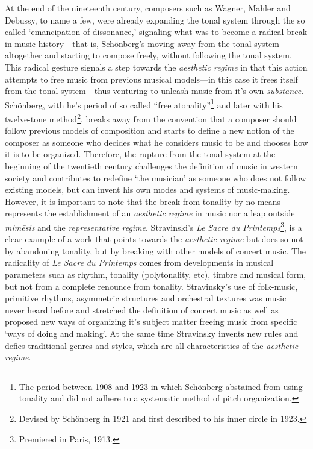 At the end of the nineteenth century, composers such as Wagner, Mahler and Debussy, to name a few, were already expanding the tonal system through the so called `emancipation of dissonance,' signaling what was to become a radical break in music history---that is, Sch\"{o}nberg's moving away from the tonal system altogether and starting to compose freely, without following the tonal system. This radical gesture signals a step towards the \emph{aesthetic regime} in that this action attempts to free music from previous musical models---in this case it frees itself from the tonal system---thus venturing to unleash music from it's own \emph{substance}. Sch\"{o}nberg, with he's period of so called ``free atonality''\footnote{The period between 1908 and 1923 in which Sch\"{o}nberg abstained from using tonality and did not adhere to a systematic method of pitch organization.} and later with his twelve-tone method\footnote{Devised by Sch\"{o}nberg in 1921 and first described to his inner circle in 1923.}, breaks away from the convention that a composer should follow previous models of composition and starts to define a new notion of the composer as someone who decides what he considers music to be and chooses how it is to be organized. Therefore, the rupture from the tonal system at the beginning of the twentieth century challenges the definition of music in western society and contributes to redefine `the musician' as someone who does not follow existing models, but can invent his own modes and systems of music-making. However, it is important to note that the break from tonality by no means represents the establishment of an \emph{aesthetic regime} in music nor a leap outside \emph{mim\={e}sis} and the \emph{representative regime}.  Stravinski's \emph{Le Sacre du Printemps}\footnote{Premiered in Paris, 1913.}, is a clear example of a work that points towards the \emph{aesthetic regime} but does so not by abandoning tonality, but by breaking with other models of concert music. The radicality of \emph{Le Sacre du Printemps} comes from developments in musical parameters such as rhythm, tonality (polytonality, etc), timbre and musical form, but not from a complete renounce from tonality. Stravinsky's use of folk-music, primitive rhythms, asymmetric structures and orchestral textures was music never heard before and stretched the definition of concert music as well as proposed new ways of organizing it's subject matter freeing music from specific `ways of doing and making'. At the same time Stravinsky invents new rules and defies traditional genres and styles, which are all characteristics of the \emph{aesthetic regime}. 

